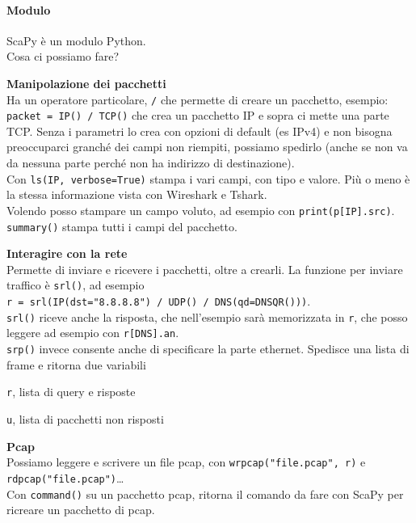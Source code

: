 \documentclass[10pt]{book}
\begin{document}
\paragraph{Modulo} ScaPy è un modulo Python.\\
Cosa ci possiamo fare? \begin{list}{}{}
	\item \textbf{Manipolazione dei pacchetti}\\
	Ha un operatore particolare, \texttt{/} che permette di creare un pacchetto, esempio: \texttt{packet = IP() / TCP()} che crea un pacchetto IP e sopra ci mette una parte TCP. Senza i parametri lo crea con opzioni di default (es IPv4) e non bisogna preoccuparci granché dei campi non riempiti, possiamo spedirlo (anche se non va da nessuna parte perché non ha indirizzo di destinazione).\\
	Con \texttt{ls(IP, verbose=True)} stampa i vari campi, con tipo e valore. Più o meno è la stessa informazione vista con Wireshark e Tshark.\\
	Volendo posso stampare un campo voluto, ad esempio con \texttt{print(p[IP].src)}.\\
	\texttt{summary()} stampa tutti i campi del pacchetto.
	\item \textbf{Interagire con la rete}\\
	Permette di inviare e ricevere i pacchetti, oltre a crearli. La funzione per inviare traffico è \texttt{srl()}, ad esempio\\\texttt{r = srl(IP(dst="8.8.8.8") / UDP() / DNS(qd=DNSQR()))}.\\
	\texttt{srl()} riceve anche la risposta, che nell'esempio sarà memorizzata in \texttt{r}, che posso leggere ad esempio con \texttt{r[DNS].an}.\\
	\texttt{srp()} invece consente anche di specificare la parte ethernet. Spedisce una lista di frame e ritorna due variabili
	\begin{list}{}{}
		\item \texttt{r}, lista di query e risposte
		\item \texttt{u}, lista di pacchetti non risposti
	\end{list}
	\item \textbf{Pcap}\\
	Possiamo leggere e scrivere un file pcap, con \texttt{wrpcap("file.pcap", r)} e \texttt{rdpcap("file.pcap")}\ldots\\
	Con \texttt{command()} su un pacchetto pcap, ritorna il comando da fare con ScaPy per ricreare un pacchetto di pcap.

\end{list}
\end{document}
